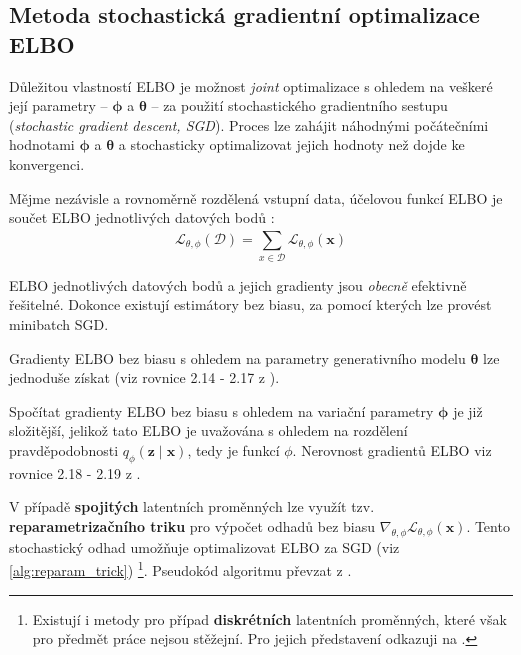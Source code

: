 \subsection{Metoda stochastická gradientní optimalizace ELBO}
\label{sec:stochastic_gradient_optimization_method}
Důležitou vlastností ELBO je možnost \emph{joint} optimalizace s ohledem na veškeré její parametry – $\boldsymbol{\phi}$ a $\boldsymbol{\theta}$ – za použití stochastického gradientního sestupu (\emph{stochastic gradient descent, SGD}).
Proces lze zahájit náhodnými počátečními hodnotami $\boldsymbol{\phi}$ a $\boldsymbol{\theta}$ a stochasticky optimalizovat jejich hodnoty než dojde ke konvergenci. \cite{Kingma2019}

Mějme nezávisle a rovnoměrně rozdělená vstupní data, účelovou funkcí ELBO je součet ELBO jednotlivých datových bodů \cite{Kingma2019}:
\begin{equation}
    \mathcal{L}_{\theta,\phi}(\mathcal{D}) = \sum_{x\in\mathcal{D}}^{} \mathcal{L}_{\theta,\phi}(\textbf{x})
\end{equation}

ELBO jednotlivých datových bodů a jejich gradienty jsou \emph{obecně} efektivně řešitelné.
Dokonce existují estimátory bez biasu, za pomocí kterých lze provést minibatch SGD.

Gradienty ELBO bez biasu s ohledem na parametry generativního modelu $\boldsymbol{\theta}$ lze jednoduše získat (viz rovnice 2.14 - 2.17 z \cite{Kingma2019}).

Spočítat gradienty ELBO bez biasu s ohledem na variační parametry $\boldsymbol{\phi}$ je již složitější, jelikož tato ELBO je uvažována s ohledem na rozdělení pravděpodobnosti $q_\phi(\textbf{z}\mid\textbf{x})$, tedy je funkcí $\phi$. Nerovnost gradientů ELBO viz rovnice 2.18 - 2.19 z \cite{Kingma2019}.

V případě \textbf{spojitých} latentních proměnných lze využít tzv. \textbf{reparametrizačního triku} pro výpočet odhadů bez biasu $\nabla_{\theta,\phi}\mathcal{L}_{\theta,\phi}(\textbf{x})$.
Tento stochastický odhad umožňuje optimalizovat ELBO za SGD (viz \autoref{alg:reparam_trick})
\footnote{Existují i metody pro případ \textbf{diskrétních} latentních proměnných, které však pro předmět práce nejsou stěžejní. Pro jejich představení odkazuji na \cite[Sekce 2.9.1.]{Kingma2019}.}. Pseudokód algoritmu převzat z \cite{Kingma2019}.

